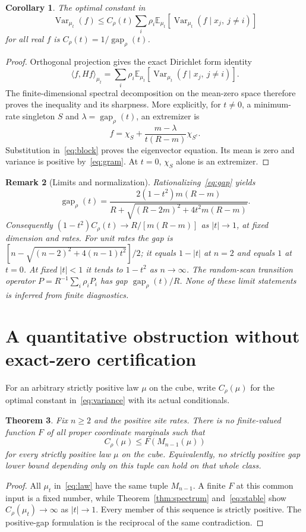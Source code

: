 \documentclass[11pt]{article}
\newtheorem{theorem}{Theorem}
\newtheorem{corollary}[theorem]{Corollary}
\newtheorem{remark}[theorem]{Remark}
\newcommand{\E}{\mathbb E}
\newcommand{\Var}{\operatorname{Var}}
\newcommand{\gap}{\operatorname{gap}}
\begin{document}
\begin{corollary}\label{cor:optimal}
The optimal constant in
\begin{equation}\label{eq:variance}
 \Var_{\mu_t}(f)\le C_\rho(t)
 \sum_i\rho_i\E_{\mu_t}[\Var_{\mu_t}(f\mid x_j,\ j\ne i)]
\end{equation}
for all real $f$ is $C_\rho(t)=1/\gap_\rho(t)$.
\end{corollary}
\begin{proof}
Orthogonal projection gives the exact Dirichlet form identity
\[
 \langle f,Hf\rangle_{\mu_t}=
 \sum_i\rho_i\E_{\mu_t}[\Var_{\mu_t}(f\mid x_j,\ j\ne i)].
\]
The finite-dimensional spectral decomposition on the mean-zero space
therefore proves the inequality and its sharpness. More explicitly,
for $t\ne0$, a minimum-rate singleton $S$ and
$\lambda=\gap_\rho(t)$, an extremizer is
\[
 f=\chi_S+\frac{m-\lambda}{t(R-m)}\chi_{S^c}.
\]
Substitution in~\eqref{eq:block} proves the eigenvector equation.
Its mean is zero and variance is positive by~\eqref{eq:gram}.
At $t=0$, $\chi_S$ alone is an extremizer.
\end{proof}

\begin{remark}[Limits and normalization]\label{rem:limits}
Rationalizing~\eqref{eq:gap} yields
\begin{equation}\label{eq:stable}
 \gap_\rho(t)=
 \frac{2(1-t^2)m(R-m)}{R+\sqrt{(R-2m)^2+4t^2m(R-m)}}.
\end{equation}
Consequently $(1-t^2)C_\rho(t)\to R/[m(R-m)]$ as $|t|\to1$,
at fixed dimension and rates. For unit rates the gap is
$[n-\sqrt{(n-2)^2+4(n-1)t^2}]/2$; it equals $1-|t|$ at $n=2$
and equals $1$ at $t=0$. At fixed $|t|<1$ it tends to $1-t^2$
as $n\to\infty$. The random-scan transition operator
$P=R^{-1}\sum_i\rho_iP_i$ has gap $\gap_\rho(t)/R$.
None of these limit statements is inferred from finite diagnostics.
\end{remark}

\section{A quantitative obstruction without exact-zero certification}
For an arbitrary strictly positive law $\mu$ on the cube, write
$C_\rho(\mu)$ for the optimal constant in~\eqref{eq:variance} with
its actual conditionals.
\begin{theorem}\label{thm:information}
Fix $n\ge2$ and the positive site rates. There is no finite-valued
function $F$ of all proper coordinate marginals such that
\[
 C_\rho(\mu)\le F(M_{n-1}(\mu))
\]
for every strictly positive law $\mu$ on the cube. Equivalently, no
strictly positive gap lower bound depending only on this tuple can
hold on that whole class.
\end{theorem}
\begin{proof}
All $\mu_t$ in~\eqref{eq:law} have the same tuple $M_{n-1}$.
A finite $F$ at this common input is a fixed number, while
Theorem~\ref{thm:spectrum} and~\eqref{eq:stable} show
$C_\rho(\mu_t)\to\infty$ as $|t|\to1$. Every member of this sequence
is strictly positive. The positive-gap formulation is the reciprocal
of the same contradiction.
\end{proof}
\end{document}
